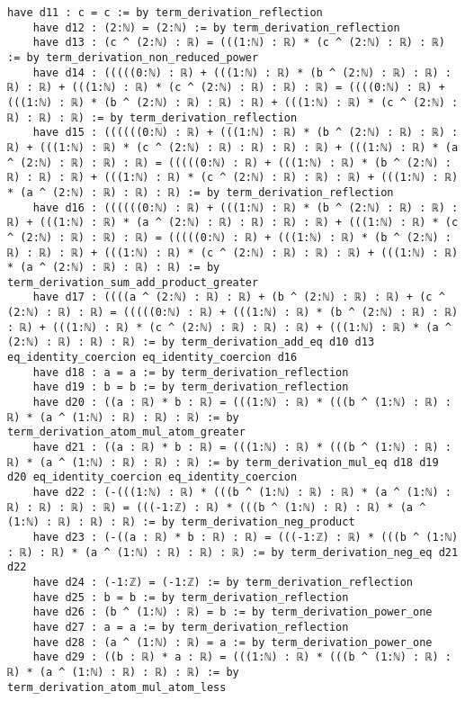 \documentclass{article}
\begin{document}
\begin{tcolorbox}[colback=white!10, width=\linewidth]
\begin{lstlisting}[language=Lean4]
    have d11 : c = c := by term_derivation_reflection
    have d12 : (2:ℕ) = (2:ℕ) := by term_derivation_reflection
    have d13 : (c ^ (2:ℕ) : ℝ) = (((1:ℕ) : ℝ) * (c ^ (2:ℕ) : ℝ) : ℝ) := by term_derivation_non_reduced_power
    have d14 : (((((0:ℕ) : ℝ) + (((1:ℕ) : ℝ) * (b ^ (2:ℕ) : ℝ) : ℝ) : ℝ) : ℝ) + (((1:ℕ) : ℝ) * (c ^ (2:ℕ) : ℝ) : ℝ) : ℝ) = ((((0:ℕ) : ℝ) + (((1:ℕ) : ℝ) * (b ^ (2:ℕ) : ℝ) : ℝ) : ℝ) + (((1:ℕ) : ℝ) * (c ^ (2:ℕ) : ℝ) : ℝ) : ℝ) := by term_derivation_reflection
    have d15 : ((((((0:ℕ) : ℝ) + (((1:ℕ) : ℝ) * (b ^ (2:ℕ) : ℝ) : ℝ) : ℝ) + (((1:ℕ) : ℝ) * (c ^ (2:ℕ) : ℝ) : ℝ) : ℝ) : ℝ) + (((1:ℕ) : ℝ) * (a ^ (2:ℕ) : ℝ) : ℝ) : ℝ) = (((((0:ℕ) : ℝ) + (((1:ℕ) : ℝ) * (b ^ (2:ℕ) : ℝ) : ℝ) : ℝ) + (((1:ℕ) : ℝ) * (c ^ (2:ℕ) : ℝ) : ℝ) : ℝ) + (((1:ℕ) : ℝ) * (a ^ (2:ℕ) : ℝ) : ℝ) : ℝ) := by term_derivation_reflection
    have d16 : ((((((0:ℕ) : ℝ) + (((1:ℕ) : ℝ) * (b ^ (2:ℕ) : ℝ) : ℝ) : ℝ) + (((1:ℕ) : ℝ) * (a ^ (2:ℕ) : ℝ) : ℝ) : ℝ) : ℝ) + (((1:ℕ) : ℝ) * (c ^ (2:ℕ) : ℝ) : ℝ) : ℝ) = (((((0:ℕ) : ℝ) + (((1:ℕ) : ℝ) * (b ^ (2:ℕ) : ℝ) : ℝ) : ℝ) + (((1:ℕ) : ℝ) * (c ^ (2:ℕ) : ℝ) : ℝ) : ℝ) + (((1:ℕ) : ℝ) * (a ^ (2:ℕ) : ℝ) : ℝ) : ℝ) := by term_derivation_sum_add_product_greater
    have d17 : ((((a ^ (2:ℕ) : ℝ) : ℝ) + (b ^ (2:ℕ) : ℝ) : ℝ) + (c ^ (2:ℕ) : ℝ) : ℝ) = (((((0:ℕ) : ℝ) + (((1:ℕ) : ℝ) * (b ^ (2:ℕ) : ℝ) : ℝ) : ℝ) + (((1:ℕ) : ℝ) * (c ^ (2:ℕ) : ℝ) : ℝ) : ℝ) + (((1:ℕ) : ℝ) * (a ^ (2:ℕ) : ℝ) : ℝ) : ℝ) := by term_derivation_add_eq d10 d13 eq_identity_coercion eq_identity_coercion d16
    have d18 : a = a := by term_derivation_reflection
    have d19 : b = b := by term_derivation_reflection
    have d20 : ((a : ℝ) * b : ℝ) = (((1:ℕ) : ℝ) * (((b ^ (1:ℕ) : ℝ) : ℝ) * (a ^ (1:ℕ) : ℝ) : ℝ) : ℝ) := by term_derivation_atom_mul_atom_greater
    have d21 : ((a : ℝ) * b : ℝ) = (((1:ℕ) : ℝ) * (((b ^ (1:ℕ) : ℝ) : ℝ) * (a ^ (1:ℕ) : ℝ) : ℝ) : ℝ) := by term_derivation_mul_eq d18 d19 d20 eq_identity_coercion eq_identity_coercion
    have d22 : (-(((1:ℕ) : ℝ) * (((b ^ (1:ℕ) : ℝ) : ℝ) * (a ^ (1:ℕ) : ℝ) : ℝ) : ℝ) : ℝ) = (((-1:ℤ) : ℝ) * (((b ^ (1:ℕ) : ℝ) : ℝ) * (a ^ (1:ℕ) : ℝ) : ℝ) : ℝ) := by term_derivation_neg_product
    have d23 : (-((a : ℝ) * b : ℝ) : ℝ) = (((-1:ℤ) : ℝ) * (((b ^ (1:ℕ) : ℝ) : ℝ) * (a ^ (1:ℕ) : ℝ) : ℝ) : ℝ) := by term_derivation_neg_eq d21 d22
    have d24 : (-1:ℤ) = (-1:ℤ) := by term_derivation_reflection
    have d25 : b = b := by term_derivation_reflection
    have d26 : (b ^ (1:ℕ) : ℝ) = b := by term_derivation_power_one
    have d27 : a = a := by term_derivation_reflection
    have d28 : (a ^ (1:ℕ) : ℝ) = a := by term_derivation_power_one
    have d29 : ((b : ℝ) * a : ℝ) = (((1:ℕ) : ℝ) * (((b ^ (1:ℕ) : ℝ) : ℝ) * (a ^ (1:ℕ) : ℝ) : ℝ) : ℝ) := by term_derivation_atom_mul_atom_less

\end{lstlisting}
\end{tcolorbox}
\end{document}
